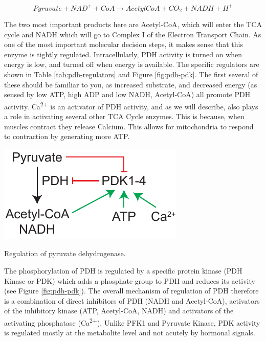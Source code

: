 \documentclass{tufte-handout}
\begin{document}
\begin{equation}
Pyruvate + NAD^+ + CoA \rightarrow AcetylCoA + CO_2 + NADH +H^+
\end{equation}

The two most important products here are Acetyl-CoA, which will enter the TCA cycle and NADH which will go to Complex I of the Electron Transport Chain.  As one of the most important molecular decision steps, it makes sense that this enzyme is tightly regulated.  Intracellularly, PDH activity is turned on when energy is low, and turned off when energy is available.  The specific regulators are shown in Table \ref{tab:pdh-regulators} and Figure \ref{fig:pdh-pdk}.  The first several of these should be familiar to you, as increased substrate, and decreased energy (as sensed by low ATP, high ADP and low NADH, Acetyl-CoA) all promote PDH activity.  Ca\textsuperscript{2+} is an activator of PDH activity, and as we will describe, also plays a role in activating several other TCA Cycle enzymes.  This is because, when muscles contract they release Calcium.  This allows for mitochondria to respond to contraction by generating more ATP.

\begin{marginfigure}
\includegraphics{figures/pdk-regulation.pdf}
\caption{Regulation of pyruvate dehydrogenase.}
\label{fig:pdh-pdk}
\end{marginfigure}

  The phosphorylation of PDH is regulated by a specific protein kinase (PDH Kinase or PDK) which adds a phosphate group to PDH and reduces its activity (see Figure \ref{fig:pdh-pdk}).  The overall mechanism of regulation of PDH therefore is a combination of direct inhibitors of PDH (NADH and Acetyl-CoA), activators of the inhibitory kinase (ATP, Acetyl-CoA, NADH) and activators of the activating phosphatase (Ca\textsuperscript{2+}).  Unlike PFK1 and Pyruvate Kinase, PDK activity is regulated mostly at the metabolite level and not acutely by hormonal signals. 
\end{document}
